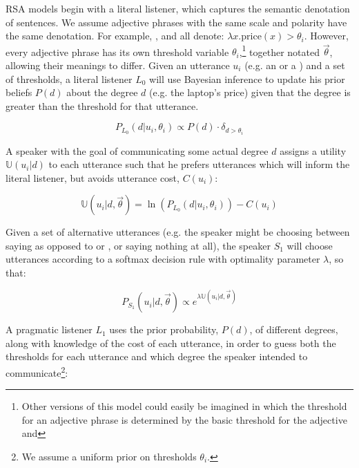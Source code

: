 RSA models begin with a literal listener, which captures the semantic denotation of sentences. 
We assume adjective phrases with the same scale and polarity have the same denotation. For example, ,  and  all denote: $\lambda x . \text{price}(x) > \theta_i$. %
However, every adjective phrase has its own threshold variable $\theta_i$,\footnote{%
%
Other versions of this model could easily be imagined in which the threshold for an adjective phrase is determined by the basic threshold for the adjective and 
%
} together notated $\vec{\theta}$, allowing their meanings to differ.
Given an utterance $u_i$ (e.g. an  or a ) and a set of thresholds, a literal listener $L_0$ will use Bayesian inference to update his prior beliefs $P(d)$ about the degree $d$ (e.g. the laptop's price) given that the degree is greater than the threshold for that utterance.

$$P_{L_0}(d|u_i, \theta_i) \propto P(d) \cdot \delta_{d > \theta_i}$$

A speaker with the goal of communicating some actual degree $d$ assigns a utility $\mathbb{U}(u_i|d)$ to each utterance such that he prefers utterances which will inform the literal listener, but avoids utterance cost, $C(u_i)$:

$$\mathbb{U}(u_i | d, \vec{\theta}) =  \ln\left(P_{L_0}(d | u_i, \theta_i) \right) - C(u_i) $$

Given a set of alternative utterances (e.g. the speaker might be choosing between saying  as opposed to  or , or saying nothing at all), the speaker $S_1$ will choose utterances according to a softmax decision rule \cite{sutton_reinforcement_2011} with optimality parameter $\lambda$, so that:

$$ P_{S_1}(u_i | d, \vec{\theta}) \propto e^{\lambda \mathbb{U}(u_i | d, \vec{\theta})} $$

A pragmatic listener $L_1$ uses the prior probability, $P(d)$, of different degrees, along with knowledge of the cost of each utterance, in order to guess both the thresholds for each utterance and which degree the speaker intended to communicate\footnote{We assume a uniform prior on thresholds $\theta_i$.}:

